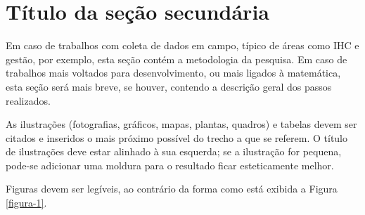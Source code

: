 \section{Título da seção secundária}

Em caso de trabalhos com coleta de dados em campo, típico de áreas como IHC e gestão, por exemplo, esta seção contém a metodologia da pesquisa. Em caso de trabalhos mais voltados para desenvolvimento, ou mais ligados à matemática, esta seção será mais breve, se houver, contendo a descrição geral dos passos realizados. 

As ilustrações (fotografias, gráficos, mapas, plantas, quadros) e tabelas devem ser citados e inseridos o mais próximo possível do trecho a que se referem. O título de ilustrações  deve estar alinhado à sua esquerda; se a ilustração for pequena, pode-se adicionar uma moldura para o resultado ficar esteticamente melhor.

Figuras devem ser legíveis, ao contrário da forma como está exibida a Figura \ref{figura-1}.  

\begin{figure}[htbp]
	\centering
\end{figure}

\lipsum[1]

\begin{figure}[htbp]
	\centering
\end{figure}


